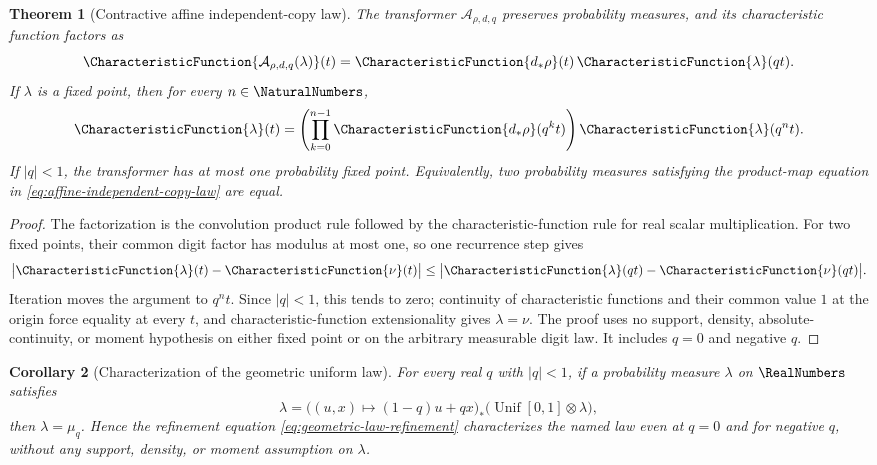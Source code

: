 \documentclass[11pt,oneside]{article}
\newtheorem{theorem}{Theorem}[section]
\newtheorem{corollary}[theorem]{Corollary}
\theoremstyle{definition}
\theoremstyle{remark}
\begin{document}
\begin{theorem}[Contractive affine independent-copy law]
\label{thm:affine-independent-copy-uniqueness}
The transformer \(\mathcal A_{\rho,d,q}\) preserves probability measures, and its
characteristic function factors as
\begin{equation}
 \CharacteristicFunction{\mathcal A_{\rho,d,q}(\lambda)}(t)
 =\CharacteristicFunction{d_*\rho}(t)\,\CharacteristicFunction{\lambda}(qt).
 \label{eq:affine-independent-copy-charfun}
\end{equation}
If \(\lambda\) is a fixed point, then for every \(n\in\NaturalNumbers\),
\begin{equation}
 \CharacteristicFunction{\lambda}(t)
 =\left(\prod_{k=0}^{n-1}\CharacteristicFunction{d_*\rho}(q^kt)\right)
    \CharacteristicFunction{\lambda}(q^nt).                 \label{eq:affine-charfun-finite-iterate}
\end{equation}
If \(|q|<1\), the transformer has at most one probability fixed point.  Equivalently, two
probability measures satisfying the product-map equation in
\eqref{eq:affine-independent-copy-law} are equal.
\end{theorem}

\begin{proof}
The factorization is the convolution product rule followed by the characteristic-function
rule for real scalar multiplication.  For two fixed points, their common digit factor has
modulus at most one, so one recurrence step gives
\[
 \bigl|\CharacteristicFunction{\lambda}(t)-\CharacteristicFunction{\nu}(t)\bigr|
 \le
 \bigl|\CharacteristicFunction{\lambda}(qt)-\CharacteristicFunction{\nu}(qt)\bigr|.
\]
Iteration moves the argument to \(q^nt\).  Since \(|q|<1\), this tends to zero; continuity
of characteristic functions and their common value \(1\) at the origin force equality at
every \(t\), and characteristic-function extensionality gives \(\lambda=\nu\).  The proof
uses no support, density, absolute-continuity, or moment hypothesis on either fixed point or
on the arbitrary measurable digit law.  It includes \(q=0\) and negative \(q\).
\end{proof}

\begin{corollary}[Characterization of the geometric uniform law]
\label{cor:geometric-uniform-law-unique}
For every real \(q\) with \(|q|<1\), if a probability measure \(\lambda\) on \(\RealNumbers\)
satisfies
\[
 \lambda
 =\bigl((u,x)\mapsto(1-q)u+qx\bigr)_*
   \bigl(\operatorname{Unif}[0,1]\otimes\lambda\bigr),
\]
then \(\lambda=\mu_q\).  Hence the refinement equation
\eqref{eq:geometric-law-refinement} characterizes the named law even at \(q=0\) and for
negative \(q\), without any support, density, or moment assumption on \(\lambda\).
\end{corollary}
\end{document}
